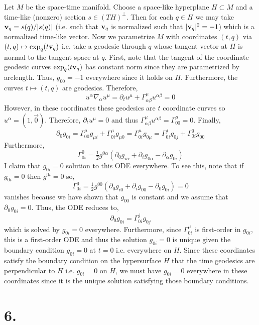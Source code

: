 \documentclass[12pt]{article}
\begin{document}
Let $M$ be the space-time manifold. Choose a space-like hyperplane $H \subset M$ and a time-like (nonzero) section $s \in (T H)^\perp$. Then for each $q \in H$ we may take $\bf{v}_q = s(q)/|s(q)|$ (i.e. such that $\bf{v}_q$ is normalized such that $|\bf{v}_q|^2 = -1$) which is a normalized time-like vector. Now we parametrize $M$ with coordinates $(t, q)$ via $(t, q) \mapsto \exp_q(t \bf{v}_q)$ i.e. take a geodesic through $q$ whose tangent vector at $H$ is normal to the tangent space at $q$. First, note that the tangent of the coordinate geodesic curves $\exp_q(t \bf{v}_q)$ has constant norm since they are parametrized by arclength. Thus, $g_{00} = -1$ everywhere since it holds on $H$. Furthermore, the curves $t \mapsto (t, q)$ are geodesics. Therefore,
\[ u^\alpha \nabla_\alpha u^\mu = \partial_t u^\mu + \Gamma^\mu_{\alpha \beta} u^{\alpha \beta} = 0 \]
However, in these coordinates these geodesics are $t$ coordinate curves so $u^\alpha = (1, \vec{0})$. Therefore, $\partial_t u^\mu = 0$ and thus $\Gamma^\mu_{\alpha \beta} u^{\alpha \beta} = \Gamma^\mu_{00} = 0$. Finally,
\[ \partial_0 g_{0i} = \Gamma^\mu_{00} g_{\mu i} + \Gamma^\mu_{0i} g_{\mu 0} = \Gamma^\mu_{0i} g_{0 \mu} = \Gamma^j_{0i} g_{0j} + \Gamma^0_{0i} g_{00} \]
Furthermore,
\[ \Gamma^0_{0i} = \tfrac{1}{2} g^{0 \alpha} \left( \partial_0 g_{i \alpha} + \partial_i g_{0 \alpha} - \partial_\alpha g_{0i} \right) \]
I claim that $g_{0i} = 0$ solution to this ODE everywhere. To see this, note that if $g_{0i} = 0$ then $g^{0i} = 0$ so,
\[ \Gamma^0_{0i} = \tfrac{1}{2} g^{00} \left( \partial_0 g_{i 0} + \partial_i g_{00} - \partial_0 g_{0i} \right) = 0 \]
vanishes because we have shown that $g_{00}$ is constant and we assume that $\partial_0 g_{0 i} = 0$. Thus, the ODE reduces to,
\[ \partial_0 g_{0i} = \Gamma^j_{0i} g_{0j} \]
which is solved by $g_{0i} = 0$ everywhere. 
Furthermore, since $\Gamma^{\mu}_{0i}$ is first-order in $g_{0i}$, this is a first-order ODE and thus the solution $g_{0i} = 0$ is unique given the boundary condition $g_{0i} = 0$ at $t = 0$ i.e. everywhere on $H$. Since these coordinates satisfy the boundary condition on the hypersurface $H$ that the time geodesics are perpendicular to $H$ i.e. $g_{0i} = 0$ on $H$, we must have $g_{0i} = 0$ everywhere in these coordinates since it is the unique solution satisfying those boundary conditions. 


\section*{6. }
\end{document}
